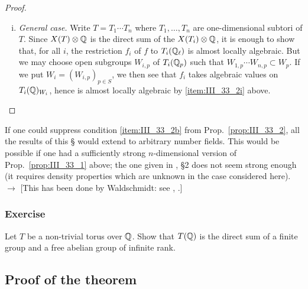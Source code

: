 \begin{proof}
\begin{enumerate}[i)]
\item \emph{General case.} Write $T = T_1 \cdots T_n$ where $T_1, \dots, T_n$
	are one-dimensional subtori of $T$. Since $X(T) \otimes \mathbb{Q}$ is the
	direct sum of the $X(T_i) \otimes \mathbb{Q}$, it is enough to show that, for
	all $i$, the restriction $f_i$ of $f$ to $T_i(\mathbb{Q}_\ell)$ is almost
	locally algebraic. But we may choose open subgroups $W_{i, p}$ of
	$T_i(\mathbb{Q}_p)$ such that $W_{1,p} \cdots W_{n,p} \subset W_p$. If we put
	$W_i = (W_{i,p})_{p\in S}$, we then see that $f_i$ takes algebraic
	values on $T_i(\mathbb{Q})_{W_i}$, hence is almost locally algebraic by
	\ref{item:III_33_2i} above. \qedhere
\end{enumerate}
\end{proof}

\begin{obs}
	If one could suppress condition \ref{item:III_33_2b} from
	Prop.~\ref{prop:III_33_2}, all the results of this \S{} would extend to
	arbitrary number fields. This would be possible if one had a
	sufficiently strong $n$-dimensional version of
	Prop.~\ref{prop:III_33_1} above; the one given in \cite{30}, \S 2 does
	not seem strong enough (it requires density properties which are
	unknown in the case considered here). $\to$ [This has been done by
	Waldschmidt: see \cite{63}, \cite{83}.]
\end{obs}

\subsubsection*{Exercise}
Let $T$ be a non-trivial torus over $\mathbb{Q}$. Show that $T(\mathbb{Q})$ is the direct sum
of a finite group and a free abelian group of infinite rank.

\subsection{Proof of the theorem}
\label{sec:III_34}

